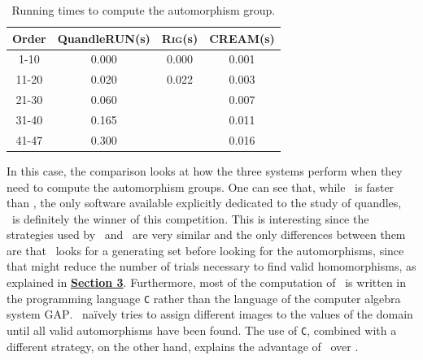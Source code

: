 \documentclass{mcom-l}
\begin{document}
\begin{table}[H]
    \centering
    \begin{tabular}{|c|c|c|c|}
        \hline
         Order & \textsf{QuandleRUN}(s) & \textsc{Rig}(s) & \textsc{CREAM}(s) \\ \hline
         1-10 & 0.000 & 0.000 & 0.001 \\ \hline
         11-20 & 0.020 & 0.022 & 0.003 \\ \hline
         21-30 & 0.060 & &  0.007 \\ \hline
         31-40 & 0.165 & & 0.011  \\ \hline
         41-47 & 0.300 & & 0.016 \\ \hline
    \end{tabular}
    
    \caption{Running times to compute the automorphism group.}
    
\end{table}
\noindent In this case, the comparison looks at how the three systems perform when they need to compute the automorphism groups. One can see that, while \Software~is faster than \rig, the only software available explicitly dedicated to the study of quandles, \cream~is definitely the winner of this competition. This is interesting since the strategies used by \rig~and \cream~are very similar and the only differences between them are that \cream~looks for a generating set before looking for the automorphisms, since that might reduce the number of trials necessary to find valid homomorphisms, as explained in \hyperref[monomorphismAlgo]{\textbf{Section 3}}. Furthermore, most of the computation of \cream~is written in the programming language \texttt{C} rather than the language of the computer algebra system \textsc{GAP}.
\rig~naïvely tries to assign different images to the values of the domain until all valid automorphisms have been found. The use of \texttt{C}, combined with a different strategy, on the other hand, explains the advantage of \cream~over \Software.
 
\end{document}
